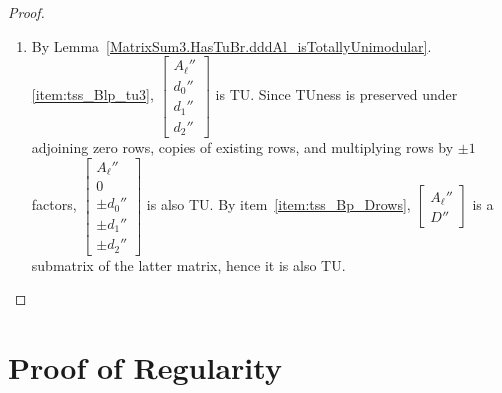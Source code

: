 \begin{proof}
\begin{enumerate}
        \item By Lemma~\ref{MatrixSum3.HasTuBr.dddAl_isTotallyUnimodular}.\ref{item:tss_Blp_tu3}, $\begin{bmatrix} A_{\ell}'' \\ d_{0}'' \\ d_{1}'' \\ d_{2}'' \end{bmatrix}$ is TU. Since TUness is preserved under adjoining zero rows, copies of existing rows, and multiplying rows by $\pm 1$ factors, $\begin{bmatrix} A_{\ell}'' \\ 0 \\ \pm d_{0}'' \\ \pm d_{1}'' \\ \pm d_{2}'' \end{bmatrix}$ is also TU. By item~\ref{item:tss_Bp_Drows}, $\begin{bmatrix} A_{\ell}'' \\ D'' \end{bmatrix}$ is a submatrix of the latter matrix, hence it is also TU.
    \end{enumerate}
\end{proof}


\section{Proof of Regularity}

